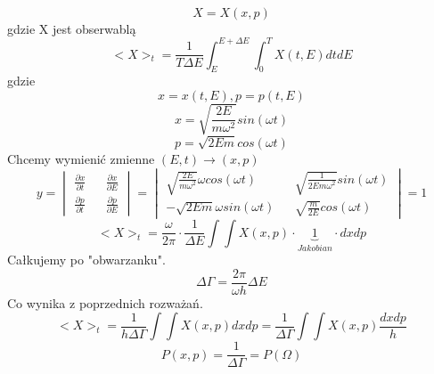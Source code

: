 \documentclass{article}
\begin{document}
		\paragraph{}
		\begin{equation}
		X=X(x,p)
		\end{equation}
		gdzie X jest obserwablą
		\begin{equation}
		<X>_t = \frac{1}{T\Delta E} \int_{E}^{E + \Delta E}\int_{0}^{T}X(t,E)dtdE
		\end{equation}
		gdzie
		\begin{equation}
		x = x(t,E),
		p = p(t,E)
		\end{equation}
		\begin{equation}
		x = \sqrt{\frac{2E}{m\omega^2}}sin(\omega t)
		\end{equation}
		\begin{equation}
		p = \sqrt{2Em} cos(\omega t)
		\end{equation}
		Chcemy wymienić zmienne $ (E,t) \longrightarrow (x,p)$
		\begin{equation}
		y=
		\begin{vmatrix}
		\frac{\partial x}{\partial t} && \frac{\partial x}{\partial E} \\
		\frac{\partial p}{\partial t} && \frac{\partial p}{\partial E}
		\end{vmatrix}
		=
		\begin{vmatrix}
		\sqrt{\frac{2E}{m\omega ^2}}\omega cos(\omega t) && \sqrt{\frac{1}{2Em\omega^2}}sin(\omega t) \\
		-\sqrt{2Em}\omega sin(\omega t) &&\sqrt{\frac{m}{2E}}cos(\omega t)
		\end{vmatrix}
		=1
		\end{equation}
		\begin{equation}
		<X>_t = \frac{\omega}{2 \pi} \cdot \frac{1}{\Delta E} \int\int X(x,p) \cdot \underbrace{1}_{Jakobian} \cdot dxdp
		\end{equation}
		Całkujemy po "obwarzanku".
		\begin{equation}
		\Delta \Gamma = \frac{2\pi}{\omega h}\Delta E
		\end{equation}
		Co wynika z poprzednich rozważań.
		\begin{equation}
		<X>_t = \frac{1}{h\Delta \Gamma}\int\int X(x,p)dxdp = 
				\frac{1}{\Delta \Gamma}\int\int X(x,p)\frac{dxdp}{h}
		\end{equation}
		\begin{equation}
		P(x,p) = \frac{1}{\Delta \Gamma} = P(\Omega)
		\end{equation}
\end{document}
